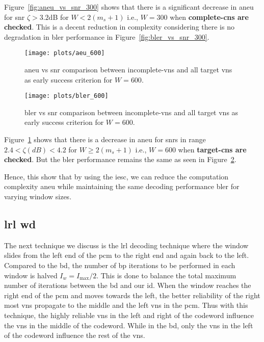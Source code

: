 Figure~\ref{fig:aneu_vs_snr_300} shows that there is a significant decrease in \ac{aneu} for \ac{snr} $\zeta>3.2$dB for $W<2(m_s+1)$ i.e., $W=300$ when \textbf{complete-\acp{cn} are checked}. This is a decent reduction in complexity considering there is no degradation in \ac{bler} performance in Figure~\ref{fig:bler_vs_snr_300}.

\begin{figure}[htbp]
  \centering
  \texttt{[image: plots/aeu\_600]}
  \caption{\ac{aneu} vs \ac{snr} comparison between incomplete-\acp{vn} and all target \acp{vn} as early success criterion for $W=600$.}
  \label{fig:aneu_vs_snr_600}
\end{figure}

\begin{figure}[htbp]
  \centering
  \texttt{[image: plots/bler\_600]}
  \caption{\ac{bler} vs \ac{snr} comparison between incomplete-\acp{vn} and all target \acp{vn} as early success criterion for $W=600$.}
  \label{fig:bler_vs_snr_600}
\end{figure}

Figure~\ref{fig:aneu_vs_snr_600} shows that there is a decrease in \ac{aneu} for \acp{snr} in range $2.4<\zeta(dB)<4.2$ for $W\geq2(m_s+1)$ i.e., $W=600$ when \textbf{target-\acp{cn} are checked}. But the \ac{bler} performance remains the same as seen in Figure~\ref{fig:bler_vs_snr_600}.

Hence, this show that by using the \ac{iesc}, we can reduce the computation complexity \ac{aneu} while maintaining the same  decoding performance \ac{bler} for varying window sizes.

\subsection{\acl{lrl} \acl{wd}}
The next technique we discuss is the \ac{lrl} decoding technique where the window slides from the left end of the \ac{pcm} to the right end and again back to the left. Compared to the \ac{bd}, the number of \ac{bp} iterations to be performed in each window is halved $I_w=I_{\text{max}}/2$. This is done to balance the total maximum number of iterations between the \ac{bd} and our \ac{id}. When the window reaches the right end of the \ac{pcm} and moves towards the left, the better reliability of the right most \acp{vn} propagate to the middle and the left \acp{vn} in the \ac{pcm}. Thus with this technique, the highly reliable \acp{vn} in the left and right of the codeword influence the \acp{vn} in the middle of the codeword. While in the \ac{bd}, only the \acp{vn} in the left of the codeword influence the rest of the \acp{vn}.